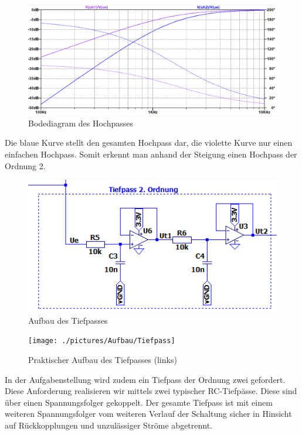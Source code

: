 \begin{figure}[htb]
    \includegraphics[width=16cm]{./pictures/Hochpass_Bode}
    \caption{Bodediagram des Hochpasses}
    \label{fig:HochpassBode}
\end{figure}

Die blaue Kurve stellt den gesamten Hochpass dar, die violette Kurve nur einen einfachen Hochpass. Somit erkennt man anhand der Steigung einen Hochpass der Ordnung 2.

\newpage
\begin{figure}[htb]
    \includegraphics[width=14cm]{./pictures/Tiefpass}
    \caption{Aufbau des Tiefpasses}
    \label{fig:Tiefpass}
\end{figure}

\begin{figure}[htb]
    \texttt{[image: ./pictures/Aufbau/Tiefpass]}
    \caption{Praktischer Aufbau des Tiefpasses (links)}
    \label{fig:TiefpassPraktisch}
\end{figure}

In der Aufgabenstellung wird zudem ein Tiefpass der Ordnung zwei gefordert. Diese Anforderung realisieren wir mittels zwei typischer RC-Tiefpässe. Diese sind über einen Spannungsfolger gekoppelt. Der gesamte Tiefpass ist mit einem weiteren Spannungsfolger vom weiteren Verlauf der Schaltung sicher in Hinsicht auf Rückkopplungen und unzulässiger Ströme abgetrennt.

